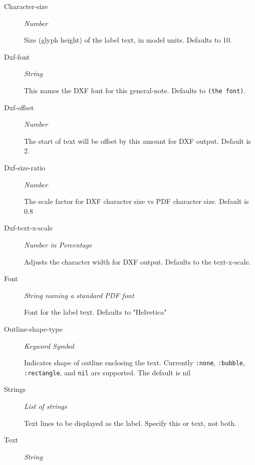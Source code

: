 \documentclass [11pt]{book}
\begin{document}
\begin{itemize}
\begin{description}
\item [Character-size]
\emph{Number}

 Size (glyph height) of the label text, in model units. Defaults to 10.




\item [Dxf-font]
\emph{String}

 This names the DXF font for this general-note. Defaults to \texttt{(the font)}.




\item [Dxf-offset]
\emph{Number}

 The start of text will be offset by this amount for DXF output. Default is 2.




\item [Dxf-size-ratio]
\emph{Number}

 The scale factor for DXF character size vs PDF character size. Default is 0.8




\item [Dxf-text-x-scale]
\emph{Number in Percentage}

 Adjusts the character width for DXF output. Defaults to the text-x-scale.




\item [Font]
\emph{String naming a standard PDF font}

 Font for the label text. Defaults to "Helvetica"




\item [Outline-shape-type]
\emph{Keyword Symbol}

 Indicates shape of outline enclosing the text. Currently \texttt{:none}, \texttt{:bubble}, \texttt{:rectangle},
and \texttt{nil} are supported. The default is nil




\item [Strings]
\emph{List of strings}

 Text lines to be displayed as the label. Specify this or text, not both.




\item [Text]
\emph{String}


\end{description}
\end{itemize}
\end{document}
